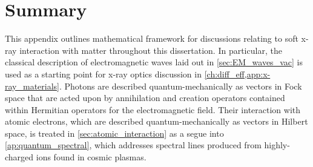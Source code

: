 \section{Summary}\label{sec:apAsummary}
This appendix outlines mathematical framework for discussions relating to soft x-ray interaction with matter throughout this dissertation. 
In particular, the classical description of electromagnetic waves laid out in \cref{sec:EM_waves_vac} is used as a starting point for x-ray optics discussion in \cref{ch:diff_eff,app:x-ray_materials}. 
Photons are described quantum-mechanically as vectors in Fock space that are acted upon by annihilation and creation operators contained within Hermitian operators for the electromagnetic field. 
Their interaction with atomic electrons, which are described quantum-mechanically as vectors in Hilbert space, is treated in \cref{sec:atomic_interaction} as a segue into \cref{ap:quantum_spectral}, which addresses spectral lines produced from highly-charged ions found in cosmic plasmas. 